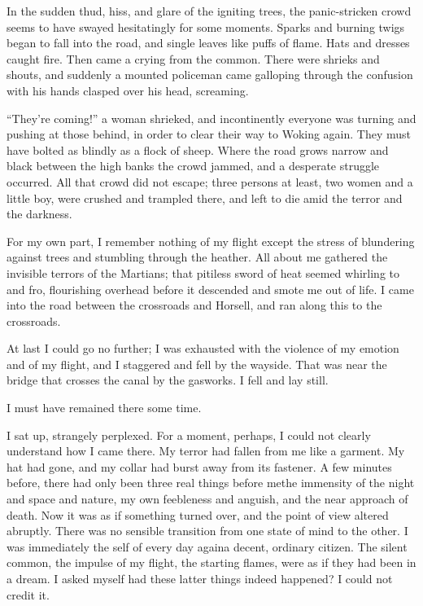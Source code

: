 In the sudden thud, hiss, and glare of the igniting trees, the
panic-stricken crowd seems to have swayed hesitatingly for some
moments. Sparks and burning twigs began to fall into the road, and
single leaves like puffs of flame. Hats and dresses caught fire.
Then came a crying from the common. There were shrieks and shouts,
and suddenly a mounted policeman came galloping through the
confusion with his hands clasped over his head, screaming.

``They're coming!'' a woman shrieked, and incontinently everyone was
turning and pushing at those behind, in order to clear their way to
Woking again. They must have bolted as blindly as a flock of sheep.
Where the road grows narrow and black between the high banks the
crowd jammed, and a desperate struggle occurred. All that crowd did
not escape; three persons at least, two women and a little boy,
were crushed and trampled there, and left to die amid the terror
and the darkness.

For my own part, I remember nothing of my flight except the stress
of blundering against trees and stumbling through the heather. All
about me gathered the invisible terrors of the Martians; that
pitiless sword of heat seemed whirling to and fro, flourishing
overhead before it descended and smote me out of life. I came into
the road between the crossroads and Horsell, and ran along this to
the crossroads.

At last I could go no further; I was exhausted with the violence of
my emotion and of my flight, and I staggered and fell by the
wayside. That was near the bridge that crosses the canal by the
gasworks. I fell and lay still.

I must have remained there some time.

I sat up, strangely perplexed. For a moment, perhaps, I could not
clearly understand how I came there. My terror had fallen from me
like a garment. My hat had gone, and my collar had burst away from
its fastener. A few minutes before, there had only been three real
things before me\dash{}the immensity of the night and space and nature,
my own feebleness and anguish, and the near approach of death. Now
it was as if something turned over, and the point of view altered
abruptly. There was no sensible transition from one state of mind
to the other. I was immediately the self of every day again\dash{}a
decent, ordinary citizen. The silent common, the impulse of my
flight, the starting flames, were as if they had been in a dream. I
asked myself had these latter things indeed happened? I could not
credit it.

